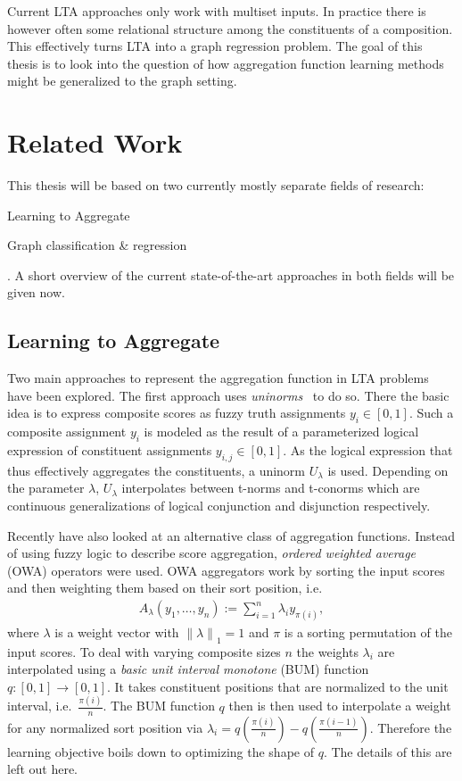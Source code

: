 \documentclass[12pt]{scrartcl}
\begin{document}
Current LTA approaches only work with multiset inputs.
In practice there is however often some relational structure among the constituents of a composition.
This effectively turns LTA into a graph regression problem.
The goal of this thesis is to look into the question of how aggregation function learning methods might be generalized to the graph setting.

\section{Related Work}%
\label{sec:related-work}

This thesis will be based on two currently mostly separate fields of research:
\begin{enumerate*}[label=\textbf{\arabic*.}]
	\item Learning to Aggregate
	\item Graph classification \& regression
\end{enumerate*}.
A short overview of the current state-of-the-art approaches in both fields will be given now.

\subsection{Learning to Aggregate}%
\label{sec:related-work:lta}

Two main approaches to represent the aggregation function in LTA problems have been explored.
The first approach uses \textit{uninorms}~\cite{Melnikov2016} to do so.
There the basic idea is to express composite scores as fuzzy truth assignments $y_i \in [0, 1]$.
Such a composite assignment $y_i$ is modeled as the result of a parameterized logical expression of constituent assignments $y_{i,j} \in [0, 1]$.
As the logical expression that thus effectively aggregates the constituents, a uninorm $U_{\lambda}$ is used.
Depending on the parameter $\lambda$, $U_{\lambda}$ interpolates between t-norms and t-conorms which are continuous generalizations of logical conjunction and disjunction respectively.

Recently \citet{Melnikov2019} have also looked at an alternative class of aggregation functions.
Instead of using fuzzy logic to describe score aggregation, \textit{ordered weighted average} (OWA) operators were used.
OWA aggregators work by sorting the input scores and then weighting them based on their sort position, i.e.\ %
\begin{align*}
	A_{\lambda}(y_1, \dots, y_n) := \sum_{i = 1}^n \lambda_i y_{\pi(i)},
\end{align*}
where $\lambda$ is a weight vector with ${\|\lambda\|}_1 = 1$ and $\pi$ is a sorting permutation of the input scores. %
To deal with varying composite sizes $n$ the weights $\lambda_i$ are interpolated using a \textit{basic unit interval monotone} (BUM) function $q: [0, 1] \to [0, 1]$.
It takes constituent positions that are normalized to the unit interval, i.e.\ $\frac{\pi(i)}{n}$.
The BUM function $q$ then is then used to interpolate a weight for any normalized sort position via $\lambda_i = q(\frac{\pi(i)}{n}) - q(\frac{\pi(i - 1)}{n})$.
Therefore the learning objective boils down to optimizing the shape of $q$.
The details of this are left out here.
\end{document}
